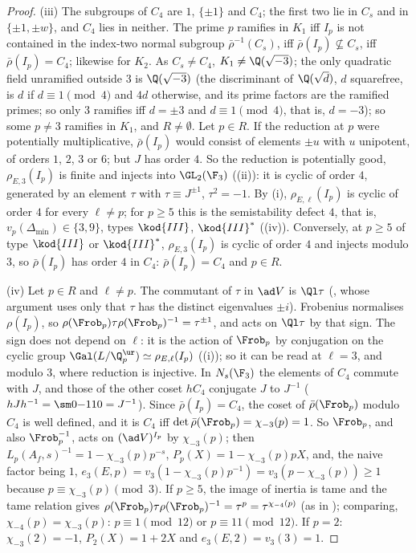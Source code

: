 \begin{proof}
(iii) The subgroups of $C_4$ are $1$, $\{\pm1\}$ and $C_4$; the first two lie in $C_s$ and in $\{\pm1,\pm w\}$, and $C_4$ lies in neither. The prime $p$ ramifies in $K_1$
iff $I_p$ is not contained in the index-two normal subgroup $\bar\rho^{-1}(C_s)$, iff $\bar\rho(I_p)\not\subseteq C_s$, iff $\bar\rho(I_p)=C_4$; likewise for $K_2$. As $C_s\ne C_4$,
$K_1\ne\Q(\sqrt{-3})$; the only quadratic field unramified outside $3$ is $\Q(\sqrt{-3})$ (the discriminant of $\Q(\sqrt d)$, $d$ squarefree, is $d$ if $d\equiv1\pmod4$ and $4d$
otherwise, and its prime factors are the ramified primes; so only $3$ ramifies iff $d=\pm3$ and $d\equiv1\pmod4$, that is, $d=-3$); so some $p\ne3$ ramifies in $K_1$, and $R\ne\emptyset$. Let $p\in R$. If the
reduction at $p$ were potentially multiplicative, $\bar\rho(I_p)$ would consist of elements $\pm u$ with $u$ unipotent, of orders $1$, $2$, $3$ or $6$; but $J$ has
order $4$. So the reduction is potentially good, $\rho_{E,3}(I_p)$ is finite and injects into $\GL_2(\F_3)$ ((ii)): it is cyclic of order $4$,
generated by an element $\tau$ with $\tau\equiv J^{\pm1}$, $\tau^2=-1$. By (i), $\rho_{E,\ell}(I_p)$ is cyclic of order $4$ for every $\ell\ne p$; for
$p\ge5$ this is the semistability defect $4$, that is, $v_p(\Delta_{\min})\in\{3,9\}$, types $\kod{III}$, $\kod{III}^*$ ((iv)). Conversely, at $p\ge5$
of type $\kod{III}$ or $\kod{III}^*$, $\rho_{E,3}(I_p)$ is cyclic of order $4$ and injects modulo $3$, so $\bar\rho(I_p)$ has order $4$ in $C_4$: $\bar\rho(I_p)=C_4$ and $p\in R$.

(iv) Let $p\in R$ and $\ell\ne p$. The commutant of $\tau$ in $\ad V$ is $\Ql\tau$ (, whose argument uses only that $\tau$ has the
distinct eigenvalues $\pm i$). Frobenius normalises $\rho(I_p)$, so $\rho(\Frob_p)\tau\rho(\Frob_p)^{-1}=\tau^{\pm1}$, and acts on $\Ql\tau$ by that sign. The sign does not depend on $\ell$: it
is the action of $\Frob_p$ by conjugation on the cyclic group $\Gal(L/\Q_p^{\ur})\simeq\rho_{E,\ell}(I_p)$ ((i)); so it can be read at $\ell=3$, and
modulo $3$, where reduction is injective. In $N_s(\F_3)$ the elements of $C_4$ commute with $J$, and those of the other coset $hC_4$ conjugate $J$ to $J^{-1}$
($hJh^{-1}=\sm0{-1}10=J^{-1}$). Since $\bar\rho(I_p)=C_4$, the coset of $\bar\rho(\Frob_p)$ modulo $C_4$ is well defined, and it is $C_4$ iff $\det\bar\rho(\Frob_p)=\chi_{-3}(p)=1$. So
$\Frob_p$, and also $\Frob_p^{-1}$, acts on $(\ad V)^{I_p}$ by $\chi_{-3}(p)$; then $L_p(A_f,s)^{-1}=1-\chi_{-3}(p)p^{-s}$, $P_p(X)=1-\chi_{-3}(p)pX$, and, the naive factor being $1$,
$e_3(E,p)=v_3(1-\chi_{-3}(p)p^{-1})=v_3(p-\chi_{-3}(p))\ge1$ because $p\equiv\chi_{-3}(p)\pmod3$. If $p\ge5$, the image of inertia is tame and the tame relation gives
$\rho(\Frob_p)\tau\rho(\Frob_p)^{-1}=\tau^p=\tau^{\chi_{-4}(p)}$ (as in ); comparing, $\chi_{-4}(p)=\chi_{-3}(p)$: $p\equiv1\pmod{12}$ or
$p\equiv11\pmod{12}$. If $p=2$: $\chi_{-3}(2)=-1$, $P_2(X)=1+2X$ and $e_3(E,2)=v_3(3)=1$.


\end{proof}
